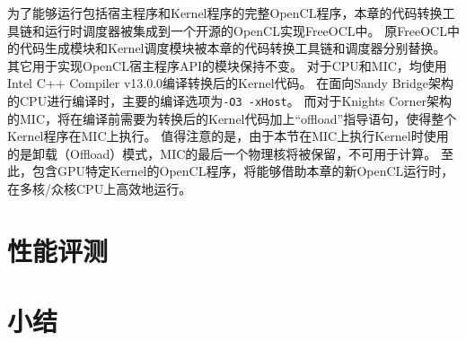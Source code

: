 为了能够运行包括宿主程序和Kernel程序的完整OpenCL程序，本章的代码转换工具链和运行时调度器被集成到一个开源的OpenCL实现\pozhehao FreeOCL中。
原FreeOCL中的代码生成模块和Kernel调度模块被本章的代码转换工具链和调度器分别替换。
其它用于实现OpenCL宿主程序API的模块保持不变。
对于CPU和MIC，均使用Intel C++ Compiler v13.0.0编译转换后的Kernel代码。
在面向Sandy Bridge架构的CPU进行编译时，主要的编译选项为\texttt{-O3 -xHost}。
而对于Knights Corner架构的MIC，将在编译前需要为转换后的Kernel代码加上``offload''指导语句，使得整个Kernel程序在MIC上执行。
值得注意的是，由于本节在MIC上执行Kernel时使用的是卸载（Offload）模式，MIC的最后一个物理核将被保留，不可用于计算。
至此，包含GPU特定Kernel的OpenCL程序，将能够借助本章的新OpenCL运行时，在多核/众核CPU上高效地运行。

\section{性能评测}
\label{kernelexperimentsec}

\section{小结}
\label{kernelconclusionsec}
